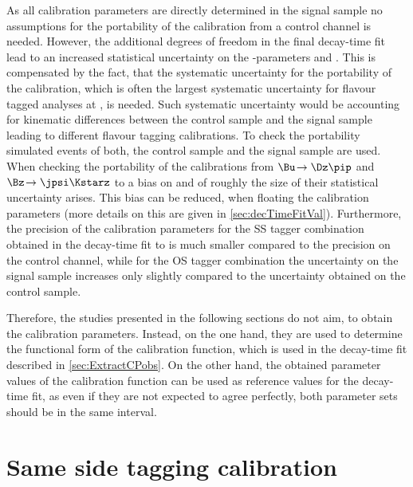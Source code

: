As all calibration parameters are directly determined in the signal sample no assumptions for the portability of the calibration from a control channel is needed.
However, the additional degrees of freedom in the final decay-time fit lead to an increased statistical uncertainty on the \CP-parameters \Sf and \Sfbar.
This is compensated by the fact, that the systematic uncertainty for the portability of the calibration, which is often the largest systematic uncertainty for flavour tagged analyses at \lhcb, is needed.
Such systematic uncertainty would be accounting for kinematic differences between the control sample and the signal sample leading to different flavour tagging calibrations.
To check the portability simulated events of both, the control sample and the signal sample are used.
When checking the portability of the calibrations from $\Bu\!\to\Dz\pip$ and $\Bz\!\to\jpsi\Kstarz$ to \BdToDpi a bias on \Sf and \Sfbar of roughly the size of their statistical uncertainty arises.
This bias can be reduced, when floating the calibration parameters (more details on this are given in \cref{sec:decTimeFitVal}).
Furthermore, the precision of the calibration parameters for the SS tagger combination obtained in the decay-time fit to \BdToDpi is much smaller compared to the precision on the control channel, while for the OS tagger combination the uncertainty on the signal sample increases only slightly compared to the uncertainty obtained on the control sample.

Therefore, the studies presented in the following sections do not aim, to obtain the calibration parameters.
Instead, on the one hand, they are used to determine the functional form of the calibration function, which is used in the decay-time fit described in \cref{sec:ExtractCPobs}.
On the other hand, the obtained parameter values of the calibration function can be used as reference values for the decay-time fit, as even if they are not expected to agree perfectly, both parameter sets should be in the same interval.

\section{Same side tagging calibration}
\label{sec:SScalibration}

